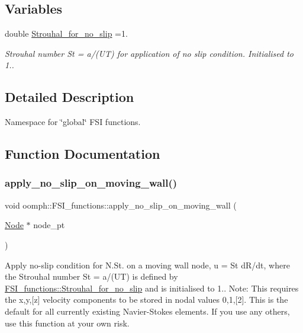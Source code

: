 \subsection*{Variables}
\begin{DoxyCompactItemize}
\item 
double \hyperlink{namespaceoomph_1_1FSI__functions_aa213854665524b0720b63a115ef57fd8}{Strouhal\+\_\+for\+\_\+no\+\_\+slip} =1.
\begin{DoxyCompactList}\small\item\em Strouhal number St = a/(UT) for application of no slip condition. Initialised to 1.. \end{DoxyCompactList}\end{DoxyCompactItemize}


\subsection{Detailed Description}
Namespace for \char`\"{}global\char`\"{} F\+SI functions. 

\subsection{Function Documentation}
\mbox{\label{namespaceoomph_1_1FSI__functions_ac1a95cf31d719f6aeceb72554ee75868}} 
\subsubsection{\texorpdfstring{apply\+\_\+no\+\_\+slip\+\_\+on\+\_\+moving\+\_\+wall()}{apply\_no\_slip\_on\_moving\_wall()}}
{\footnotesize\ttfamily void oomph\+::\+F\+S\+I\+\_\+functions\+::apply\+\_\+no\+\_\+slip\+\_\+on\+\_\+moving\+\_\+wall (\begin{DoxyParamCaption}\item[{\hyperlink{classoomph_1_1Node}{Node} $\ast$}]{node\+\_\+pt }\end{DoxyParamCaption})}



Apply no-\/slip condition for N.\+St. on a moving wall node, u = St d\+R/dt, where the Strouhal number St = a/(UT) is defined by \hyperlink{namespaceoomph_1_1FSI__functions_aa213854665524b0720b63a115ef57fd8}{F\+S\+I\+\_\+functions\+::\+Strouhal\+\_\+for\+\_\+no\+\_\+slip} and is initialised to 1.. Note\+: This requires the x,y,\mbox{[}z\mbox{]} velocity components to be stored in nodal values 0,1,\mbox{[}2\mbox{]}. This is the default for all currently existing Navier-\/\+Stokes elements. If you use any others, use this function at your own risk. 

